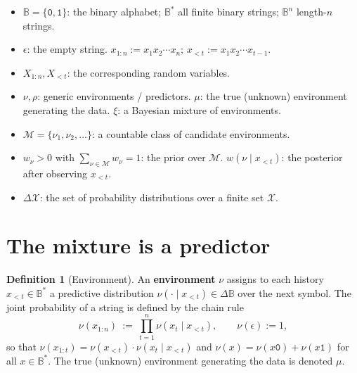 \documentclass[fontsize=11pt, parskip=half]{scrartcl}
\theoremstyle{definition}
\newtheorem{definition}[theorem]{Definition}
\newcommand{\Mc}{\mathcal{M}}
\begin{document}
\begin{defbox}
\begin{itemize}\itemsep=2pt
  \item $\mathbb{B} = \{\texttt{0}, \texttt{1}\}$: the binary alphabet; $\mathbb{B}^*$ all finite binary strings; $\mathbb{B}^n$ length-$n$ strings.
  \item $\epsilon$: the empty string. $x_{1:n} := x_1 x_2 \cdots x_n$; $x_{<t} := x_1 x_2 \cdots x_{t-1}$.
  \item $X_{1:n}, X_{<t}$: the corresponding random variables.
  \item $\nu, \rho$: generic environments / predictors. $\mu$: the true (unknown) environment generating the data. $\xi$: a Bayesian mixture of environments.
  \item $\Mc = \{\nu_1, \nu_2, \ldots\}$: a countable class of candidate environments.
  \item $w_\nu > 0$ with $\sum_{\nu \in \Mc} w_\nu = 1$: the prior over $\Mc$. $w(\nu \mid x_{<t})$: the posterior after observing $x_{<t}$.
  \item $\Delta \mathcal{X}$: the set of probability distributions over a finite set $\mathcal{X}$.
\end{itemize}
\end{defbox}

\section{The mixture is a predictor}\label{prob:one_step}

\begin{definition}[Environment]\label{def:environment}
An \textbf{environment} $\nu$ assigns to each history $x_{<t} \in \mathbb{B}^*$ a predictive distribution $\nu(\cdot \mid x_{<t}) \in \Delta \mathbb{B}$ over the next symbol. The joint probability of a string is defined by the chain rule
\[
\nu(x_{1:n}) ~:=~ \prod_{t=1}^{n} \nu(x_t \mid x_{<t}), \qquad \nu(\epsilon) := 1,
\]
so that $\nu(x_{1:t}) = \nu(x_{<t}) \cdot \nu(x_t \mid x_{<t})$ and $\nu(x) = \nu(x\texttt{0}) + \nu(x\texttt{1})$ for all $x \in \mathbb{B}^*$. The true (unknown) environment generating the data is denoted $\mu$.
\end{definition}
\end{document}
